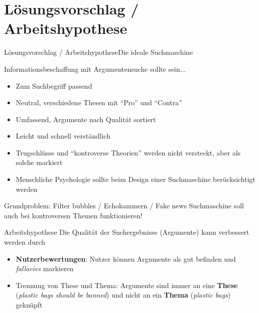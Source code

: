 \documentclass{beamer}
\begin{document}
	\section{Lösungsvorschlag / Arbeitshypothese}
	\begin{frame}{Lösungsvorschlag / Arbeitshypothese}{Die ideale Suchmaschine}
		\begin{block}{Informationsbeschaffung mit Argumentensuche sollte sein...}
			\begin{itemize}
				\item Zum Suchbegriff passend
				\item Neutral, verschiedene Thesen mit ``Pro'' und ``Contra''
				\item Umfassend, Argumente nach Qualität sortiert
				\item Leicht und schnell verständlich
				\item Trugschlüsse und ``kontroverse Theorien'' werden nicht versteckt, aber als solche markiert
				\item Menschliche Psychologie sollte beim Design einer Suchmaschine berücksichtigt werden
			\end{itemize}
		\end{block}
		\begin{block}{Grundproblem: Filter bubbles / Echokammern / Fake news}
			Suchmaschine soll auch bei kontroversen Themen funktionieren!
		\end{block}
	\end{frame}

	\begin{frame}{Arbeitshypothese}
		Die Qualität der Suchergebnisse (Argumente) kann verbessert werden durch
		\begin{itemize}[<+->]
			\item \textbf{Nutzerbewertungen}: Nutzer können Argumente als gut befinden und \textit{fallacies} markieren
			\item Trennung von These und Thema: Argumente sind immer an eine \textbf{These} (\textit{plastic bags should be banned}) und nicht an ein \textbf{Thema} (\textit{plastic bags}) geknüpft
		\end{itemize}
	\end{frame}
\end{document}
